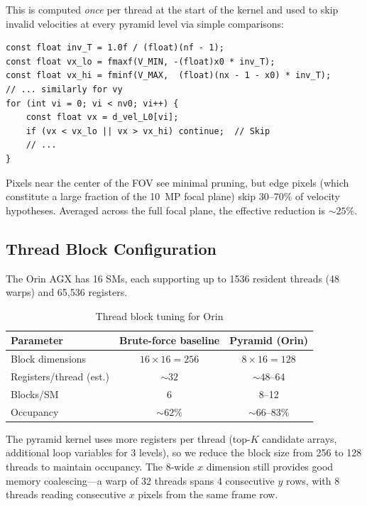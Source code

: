 \documentclass[11pt,letterpaper]{article}
\begin{document}
This is computed \emph{once} per thread at the start of the kernel and
used to skip invalid velocities at every pyramid level via simple
comparisons:

\begin{lstlisting}[style=cuda, caption={Bounds pruning in the search kernel}]
const float inv_T = 1.0f / (float)(nf - 1);
const float vx_lo = fmaxf(V_MIN, -(float)x0 * inv_T);
const float vx_hi = fminf(V_MAX,  (float)(nx - 1 - x0) * inv_T);
// ... similarly for vy
for (int vi = 0; vi < nv0; vi++) {
    const float vx = d_vel_L0[vi];
    if (vx < vx_lo || vx > vx_hi) continue;  // Skip
    // ...
}
\end{lstlisting}

Pixels near the center of the FOV see minimal pruning, but edge pixels
(which constitute a large fraction of the 10~MP focal plane) skip 30--70\%
of velocity hypotheses. Averaged across the full focal plane, the effective
reduction is ${\sim}25$\%.


\subsection{Thread Block Configuration}
\label{sec:blockconfig}

The Orin AGX has 16 SMs, each supporting up to 1536 resident threads
(48 warps) and 65,536 registers.

\begin{table}[h]
\centering
\caption{Thread block tuning for Orin}
\label{tab:blocks}
\begin{tabular}{lcc}
\toprule
\textbf{Parameter} & \textbf{Brute-force baseline} & \textbf{Pyramid (Orin)} \\
\midrule
Block dimensions     & $16 \times 16 = 256$ & $8 \times 16 = 128$ \\
Registers/thread (est.) & ${\sim}32$ & ${\sim}48$--$64$ \\
Blocks/SM            & 6              & 8--12 \\
Occupancy            & ${\sim}62\%$   & ${\sim}66$--$83\%$ \\
\bottomrule
\end{tabular}
\end{table}

The pyramid kernel uses more registers per thread (top-$K$ candidate
arrays, additional loop variables for 3 levels), so we reduce the block
size from 256 to 128 threads to maintain occupancy. The 8-wide $x$
dimension still provides good memory coalescing---a warp of 32 threads
spans 4 consecutive $y$ rows, with 8 threads reading consecutive $x$
pixels from the same frame row.
\end{document}
